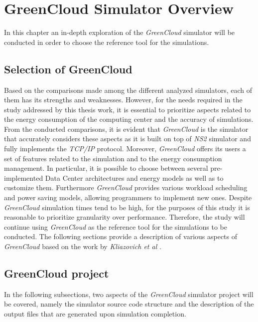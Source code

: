 \chapter{GreenCloud Simulator Overview}

\begin{citazione}
In this chapter an in-depth exploration of the \emph{GreenCloud} simulator will be conducted in order to choose the reference tool for the simulations.
\end{citazione}
\newpage

\section{Selection of GreenCloud} 
Based on the comparisons made among the different analyzed simulators, each of them has its strengths and weaknesses. However, for the needs required in the study addressed by this thesis work, it is essential to prioritize aspects related to the energy consumption of the computing center and the accuracy of simulations. From the conducted comparisons, it is evident that \emph{GreenCloud} is the simulator that accurately considers these aspects as it is built on top of \emph{NS2} simulator and fully implements the \emph{TCP/IP} protocol. Moreover, \emph{GreenCloud} offers its users a set of features related to the simulation and to the energy consumption management. In particular, it is possible to choose between several pre-implemented Data Center architectures and energy models as well as to customize them. Furthermore \emph{GreenCloud} provides various workload scheduling and power saving models, allowing programmers to implement new ones. Despite \emph{GreenCloud} simulation times tend to be high, for the purposes of this study it is reasonable to prioritize granularity over performance. Therefore, the study will continue using \emph{GreenCloud} as the reference tool for the simulations to be conducted. The following sections provide a description of various aspects of \emph{GreenCloud} based on the work by \emph{Kliazovich et al} \cite{kliazovich2012greencloud}.

\section{GreenCloud project}
In the following subsections, two aspects of the \emph{GreenCloud} simulator project will be covered, namely the simulator source code structure and the description of the output files that are generated upon simulation completion.  
